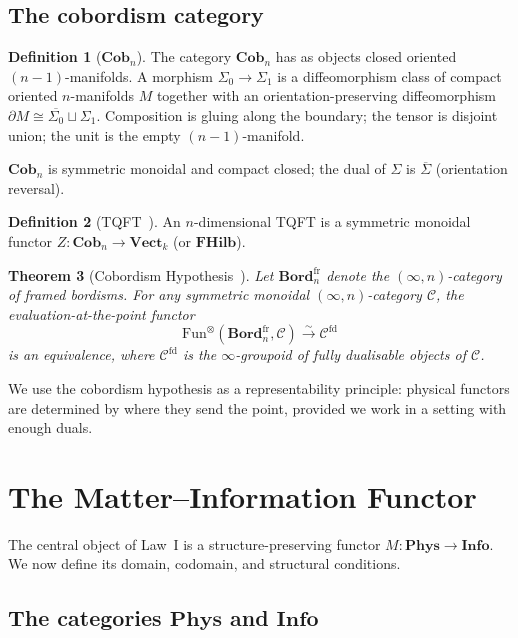 \documentclass[12pt]{article}
\newtheorem{theorem}{Theorem}[section]
\theoremstyle{definition}
\newtheorem{definition}[theorem]{Definition}
\theoremstyle{remark}
\newcommand{\C}{\mathcal{C}}
\newcommand{\Phys}{\mathbf{Phys}}
\newcommand{\Info}{\mathbf{Info}}
\newcommand{\FHilb}{\mathbf{FHilb}}
\newcommand{\Vect}{\mathbf{Vect}}
\newcommand{\Cob}{\mathbf{Cob}}
\newcommand{\Bord}{\mathbf{Bord}}
\begin{document}
\subsection{The cobordism category}

\begin{definition}[$\Cob_n$]
\label{def:cob-n}
The category $\Cob_n$ has as objects closed oriented $(n-1)$-manifolds. A morphism $\Sigma_0 \to \Sigma_1$ is a diffeomorphism class of compact oriented $n$-manifolds $M$ together with an orientation-preserving diffeomorphism $\partial M \cong \overline{\Sigma_0} \sqcup \Sigma_1$. Composition is gluing along the boundary; the tensor is disjoint union; the unit is the empty $(n-1)$-manifold.
\end{definition}

$\Cob_n$ is symmetric monoidal and compact closed; the dual of $\Sigma$ is $\overline{\Sigma}$ (orientation reversal).

\begin{definition}[TQFT~\cite{atiyah1988}]
An $n$-dimensional TQFT is a symmetric monoidal functor $Z : \Cob_n \to \Vect_k$ (or $\FHilb$).
\end{definition}

\begin{theorem}[Cobordism Hypothesis~\cite{baezdolan1995,lurie2009}]
\label{thm:cobordism}
Let $\Bord_n^{\mathrm{fr}}$ denote the $(\infty,n)$-category of framed bordisms. For any symmetric monoidal $(\infty,n)$-category $\C$, the evaluation-at-the-point functor
\[
\mathrm{Fun}^{\otimes}(\Bord_n^{\mathrm{fr}}, \C) \xrightarrow{\sim} \C^{\mathrm{fd}}
\]
is an equivalence, where $\C^{\mathrm{fd}}$ is the $\infty$-groupoid of fully dualisable objects of $\C$.
\end{theorem}

We use the cobordism hypothesis as a representability principle: physical functors are determined by where they send the point, provided we work in a setting with enough duals.

\section{The Matter--Information Functor}
\label{sec:matter-info-functor}

The central object of Law~I is a structure-preserving functor $M : \Phys \to \Info$. We now define its domain, codomain, and structural conditions.

\subsection{The categories \texorpdfstring{$\Phys$}{Phys} and \texorpdfstring{$\Info$}{Info}}
\end{document}
